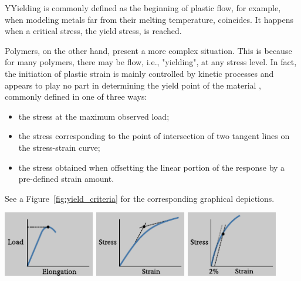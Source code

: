 \begin{remark}
	YYielding is commonly defined as the beginning of plastic flow, for example, when modeling  metals far from their melting temperature, coincides.
	It happens when a critical stress, the yield stress, is reached.

	Polymers, on the other hand, present a more complex situation.
	This is because for many polymers, there may be flow, i.e., "yielding", at any stress level.
	In fact, the initiation of plastic strain is mainly controlled by kinetic processes and appears to play no part in determining the yield point of the material \citep{fotheringhamRoleRecoveryForces1978}, commonly defined in one of three ways: \citep{wardReviewYieldBehaviour1971}
	\begin{itemize}
		\item the stress at the maximum observed load;
		\item the stress corresponding to the point of intersection of two tangent lines on the stress-strain curve;
		\item the stress obtained when offsetting the linear portion of the response by a pre-defined strain amount.
	\end{itemize}
	See a Figure~\ref{fig:yield_criteria} for the corresponding graphical depictions.
	\begin{center}
			\centering
								\includegraphics[width=0.3\textwidth]{figures/yield_criterion_a}
				\hfill
							\includegraphics[width=0.3\textwidth]{figures/yield_criterion_b}
			\hfill
								\includegraphics[width=0.3\textwidth]{figures/yield_criterion_c}
		\label{fig:yield_criteria}
	\end{center}
\label{rmrk:yield_polymer}
\end{remark}


